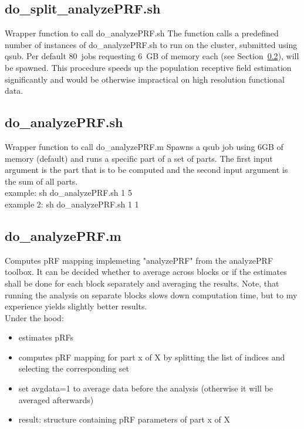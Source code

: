 \documentclass[12pt,a4paper]{scrartcl}
\begin{document}
\subsection{do\_split\_analyzePRF.sh}
\label{sec:splitanalyzePRF.sh}
Wrapper function to call do\_analyzePRF.sh The function calls a predefined number of instances of do\_analyzePRF.sh to run on the cluster, submitted using qsub. Per default 80~jobs requesting 6~GB of memory each (see Section~\ref{sec:analyzePRF.sh}), will be spawned. This procedure speeds up the population receptive field estimation significantly and would be otherwise impractical on high resolution functional data.\\

\subsection{do\_analyzePRF.sh}
\label{sec:analyzePRF.sh}
Wrapper function to call do\_analyzePRF.m Spawns a qsub job using 6GB of memory (default) and runs a specific part of a set of parts. The first input argument is the part that is to be computed and the second input argument is the sum of all parts.\\

\noindent example: sh do\_analyzePRF.sh 1 5\\

\noindent example 2: sh do\_analyzePRF.sh 1 1

\subsection{do\_analyzePRF.m}
Computes pRF mapping implemeting "analyzePRF" from the analyzePRF toolbox. It can be decided whether to average across blocks or if the estimates shall be done for each block separately and averaging the results. Note, that running the analysis on separate blocks slows down computation time, but to my experience yields slightly better results.\\

\noindent Under the hood:
\begin{itemize}
\item estimates pRFs
\item computes pRF mapping for part x of X by splitting the list of indices and selecting the corresponding set
\item set avgdata=1 to average data before the analysis (otherwise it will be averaged afterwards)
\item result: structure containing pRF parameters of part x of X
\end{itemize}
\end{document}
